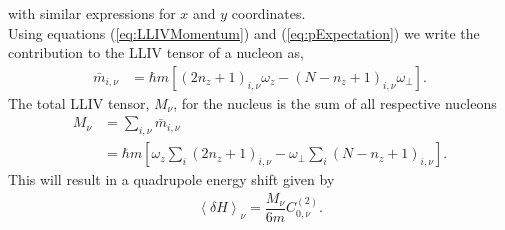 \documentclass[10pt,a4paper, twoside, openright]{report}
\begin{document}
with similar expressions for $x$ and $y$ coordinates. \\
\linebreak
Using equations (\ref{eq:LLIVMomentum}) and (\ref{eq:pExpectation}) we write the contribution to the LLIV tensor of a nucleon as,
\begin{align} \label{eq:MDimensionful}
\bar{m}_{i,\nu} &= \hbar m\left[\left(2n_z + 1\right)_{i,\nu}\omega_z - \left(N - n_z + 1\right)_{i,\nu}\omega_{\perp}\right].
\end{align}
The total LLIV tensor, $M_{\nu}$,  for the nucleus is the sum of all respective nucleons
\begin{align}
M_{\nu} &= \sum_{i,\nu} \bar{m}_{i,\nu} \nonumber \\
&= \hbar m\left[\omega_z\sum_{i}\left(2n_z + 1\right)_{i,\nu} - \omega_{\perp}\sum_{i}\left(N - n_z + 1\right)_{i,\nu}\right]. \label{eq:CollectiveQDim}
\end{align}
This will result in a quadrupole energy shift given by
\begin{align} \label{eq:LLIVEnergyShift}
\left<\delta H\right>_{\nu} = \dfrac{M_{\nu}}{6m} C_{0,\nu}^{(2)}.
\end{align}
\end{document}
